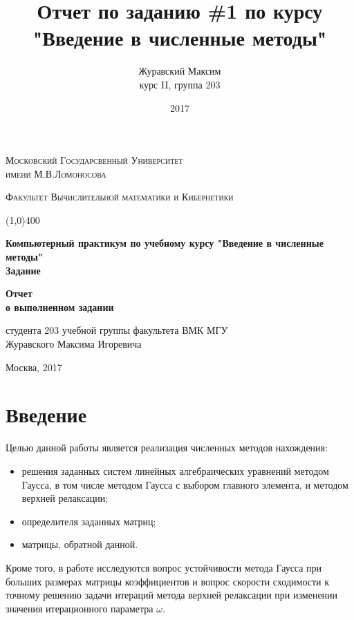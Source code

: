 \documentclass[12pt, a4paper]{report}
\title{Отчет по заданию \#1 по курсу "Введение в численные методы"}
\author{Журавский Максим \\
        курс II, группа 203}
\date{2017}
\begin{document}
\begin{titlepage}
    \begin{center}
    {\scshape\large Московский Государсвенный Университет \\
                    имени М.В.Ломоносова \par}
    {\scshape\large Факультет Вычислительной математики и Кибернетики \par}
    
    \begin{center}
    \line(1,0){400}
    \end{center}
    
    \vspace{6cm}
	{\Large\bfseries{} Компьютерный практикум по учебному курсу
                     "Введение в численные методы" \\
                     Задание  \par}
    \vspace{3cm}
    {\Large\bfseries Отчет \\
            о выполненном задании \par}
    {\large студента 203 учебной группы факультета ВМК МГУ \\
            Журавского Максима Игоревича \par}
    \vfill
    {\normalsize Москва, 2017 \par}
    \end{center}
\end{titlepage}



\tableofcontents
\newpage



\chapter{Введение}
Целью данной работы является реализация численных методов нахождения:

\begin{itemize}
\item{решения заданных систем линейных алгебраических уравнений методом Гаусса,
        в том числе методом Гаусса с выбором главного элемента, и методом верхней релаксации;}
\item{определителя заданных матриц;}
\item{матрицы, обратной данной.}
\end{itemize}
\normalsize{Кроме того, в работе исследуются вопрос устойчивости метода Гаусса
            при больших размерах матрицы коэффициентов и вопрос скорости сходимости
            к точному решению задачи итераций метода верхней релаксации при изменении значения
            итерационного параметра $\omega$}.
\newpage
\end{document}
